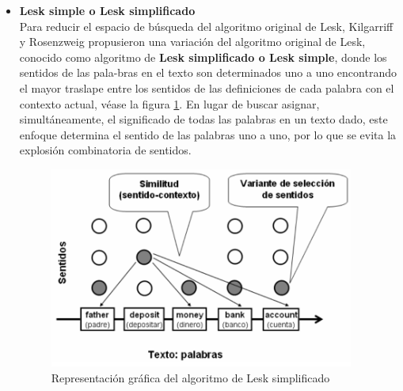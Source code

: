 \begin{itemize}
  \item \textbf{Lesk simple o Lesk simplificado} \\
    Para reducir el espacio de búsqueda del algoritmo original de Lesk, Kilgarriff y Rosenzweig \cite{004} propusieron una variación del algoritmo original de Lesk, conocido como algoritmo de \textbf{Lesk simplificado o Lesk simple}, donde los sentidos de las pala-bras en el texto son determinados uno a uno encontrando el mayor traslape entre los sentidos de las definiciones de cada palabra con el contexto actual, véase la figura \ref{fig:lesk_simple}. En lugar de buscar asignar, simultáneamente, el significado de todas las palabras en un texto dado, este enfoque determina el sentido de las palabras uno a uno, por lo que se evita la explosión combinatoria de sentidos.
  
    \begin{figure}[h!]
      \begin{center}
      \includegraphics[angle=0, width=10cm]{Graficos/lesk_simple}
      \caption{Representación gráfica del algoritmo de Lesk simplificado \cite{001}}
      \label{fig:lesk_simple}
      \end{center}
    \end{figure}
    

\end{itemize}

